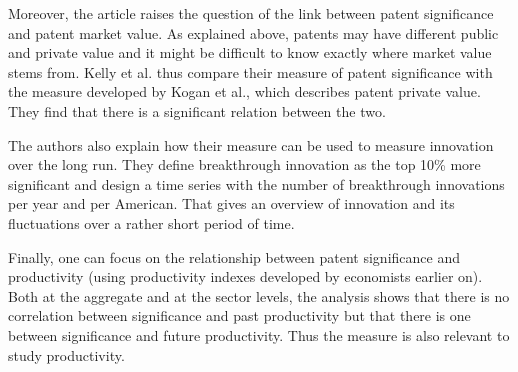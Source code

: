 \documentclass[12pt]{article}
\begin{document}
Moreover, the article raises the question of the link between patent significance and patent market value. As explained above, patents may have different public and private value and it might be difficult to know exactly where market value stems from. Kelly et al. thus compare their measure of patent significance with the measure developed by Kogan et al., which describes patent private value. They find that there is a significant relation between the two.

The authors also explain how their measure can be used to measure innovation over the long run. They define breakthrough innovation as the top 10\% more significant and design a time series with the number of breakthrough innovations per year and per American. That gives an overview of innovation and its fluctuations over a rather short period of time. 

Finally, one can focus on the relationship between patent significance and productivity (using productivity indexes developed by economists earlier on). Both at the aggregate and at the sector levels, the analysis shows that there is no correlation between significance and past productivity but that there is one between significance and future productivity. Thus the measure is also relevant to study productivity. 
\end{document}
